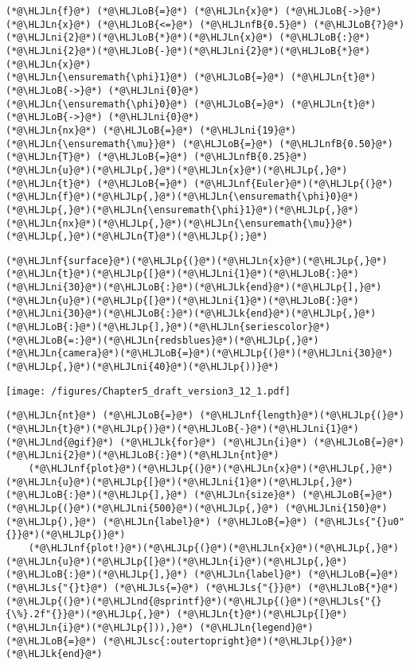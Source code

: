 \documentclass[12pt,landscape]{article}
\newcommand{\HLJLk}[1]{\textcolor[RGB]{148,91,176}{\textbf{#1}}}
\newcommand{\HLJLn}[1]{#1}
\newcommand{\HLJLnd}[1]{\textcolor[RGB]{214,102,97}{#1}}
\newcommand{\HLJLnf}[1]{\textcolor[RGB]{66,102,213}{#1}}
\newcommand{\HLJLs}[1]{\textcolor[RGB]{201,61,57}{#1}}
\newcommand{\HLJLsc}[1]{\textcolor[RGB]{201,61,57}{#1}}
\newcommand{\HLJLnfB}[1]{\textcolor[RGB]{59,151,46}{#1}}
\newcommand{\HLJLni}[1]{\textcolor[RGB]{59,151,46}{#1}}
\newcommand{\HLJLoB}[1]{\textcolor[RGB]{102,102,102}{\textbf{#1}}}
\newcommand{\HLJLp}[1]{#1}
\begin{document}
{\begin{lstlisting}
(*@\HLJLn{f}@*) (*@\HLJLoB{=}@*) (*@\HLJLn{x}@*) (*@\HLJLoB{->}@*) (*@\HLJLn{x}@*) (*@\HLJLoB{<=}@*) (*@\HLJLnfB{0.5}@*) (*@\HLJLoB{?}@*) (*@\HLJLni{2}@*)(*@\HLJLoB{*}@*)(*@\HLJLn{x}@*) (*@\HLJLoB{:}@*) (*@\HLJLni{2}@*)(*@\HLJLoB{-}@*)(*@\HLJLni{2}@*)(*@\HLJLoB{*}@*)(*@\HLJLn{x}@*)
(*@\HLJLn{\ensuremath{\phi}1}@*) (*@\HLJLoB{=}@*) (*@\HLJLn{t}@*) (*@\HLJLoB{->}@*) (*@\HLJLni{0}@*)
(*@\HLJLn{\ensuremath{\phi}0}@*) (*@\HLJLoB{=}@*) (*@\HLJLn{t}@*) (*@\HLJLoB{->}@*) (*@\HLJLni{0}@*)
(*@\HLJLn{nx}@*) (*@\HLJLoB{=}@*) (*@\HLJLni{19}@*)
(*@\HLJLn{\ensuremath{\mu}}@*) (*@\HLJLoB{=}@*) (*@\HLJLnfB{0.50}@*)
(*@\HLJLn{T}@*) (*@\HLJLoB{=}@*) (*@\HLJLnfB{0.25}@*)
(*@\HLJLn{u}@*)(*@\HLJLp{,}@*)(*@\HLJLn{x}@*)(*@\HLJLp{,}@*)(*@\HLJLn{t}@*) (*@\HLJLoB{=}@*) (*@\HLJLnf{Euler}@*)(*@\HLJLp{(}@*)(*@\HLJLn{f}@*)(*@\HLJLp{,}@*)(*@\HLJLn{\ensuremath{\phi}0}@*)(*@\HLJLp{,}@*)(*@\HLJLn{\ensuremath{\phi}1}@*)(*@\HLJLp{,}@*)(*@\HLJLn{nx}@*)(*@\HLJLp{,}@*)(*@\HLJLn{\ensuremath{\mu}}@*)(*@\HLJLp{,}@*)(*@\HLJLn{T}@*)(*@\HLJLp{);}@*)
\end{lstlisting}


\begin{lstlisting}
(*@\HLJLnf{surface}@*)(*@\HLJLp{(}@*)(*@\HLJLn{x}@*)(*@\HLJLp{,}@*)(*@\HLJLn{t}@*)(*@\HLJLp{[}@*)(*@\HLJLni{1}@*)(*@\HLJLoB{:}@*)(*@\HLJLni{30}@*)(*@\HLJLoB{:}@*)(*@\HLJLk{end}@*)(*@\HLJLp{],}@*)(*@\HLJLn{u}@*)(*@\HLJLp{[}@*)(*@\HLJLni{1}@*)(*@\HLJLoB{:}@*)(*@\HLJLni{30}@*)(*@\HLJLoB{:}@*)(*@\HLJLk{end}@*)(*@\HLJLp{,}@*)(*@\HLJLoB{:}@*)(*@\HLJLp{],}@*)(*@\HLJLn{seriescolor}@*)(*@\HLJLoB{=:}@*)(*@\HLJLn{redsblues}@*)(*@\HLJLp{,}@*) (*@\HLJLn{camera}@*)(*@\HLJLoB{=}@*)(*@\HLJLp{(}@*)(*@\HLJLni{30}@*)(*@\HLJLp{,}@*)(*@\HLJLni{40}@*)(*@\HLJLp{))}@*)
\end{lstlisting}

\texttt{[image: /figures/Chapter5\_draft\_version3\_12\_1.pdf]}

\begin{lstlisting}
(*@\HLJLn{nt}@*) (*@\HLJLoB{=}@*) (*@\HLJLnf{length}@*)(*@\HLJLp{(}@*)(*@\HLJLn{t}@*)(*@\HLJLp{)}@*)(*@\HLJLoB{-}@*)(*@\HLJLni{1}@*)
(*@\HLJLnd{@gif}@*) (*@\HLJLk{for}@*) (*@\HLJLn{i}@*) (*@\HLJLoB{=}@*) (*@\HLJLni{2}@*)(*@\HLJLoB{:}@*)(*@\HLJLn{nt}@*) 
    (*@\HLJLnf{plot}@*)(*@\HLJLp{(}@*)(*@\HLJLn{x}@*)(*@\HLJLp{,}@*) (*@\HLJLn{u}@*)(*@\HLJLp{[}@*)(*@\HLJLni{1}@*)(*@\HLJLp{,}@*)(*@\HLJLoB{:}@*)(*@\HLJLp{],}@*) (*@\HLJLn{size}@*) (*@\HLJLoB{=}@*) (*@\HLJLp{(}@*)(*@\HLJLni{500}@*)(*@\HLJLp{,}@*) (*@\HLJLni{150}@*)(*@\HLJLp{),}@*) (*@\HLJLn{label}@*) (*@\HLJLoB{=}@*) (*@\HLJLs{"{}u0"{}}@*)(*@\HLJLp{)}@*)
    (*@\HLJLnf{plot!}@*)(*@\HLJLp{(}@*)(*@\HLJLn{x}@*)(*@\HLJLp{,}@*) (*@\HLJLn{u}@*)(*@\HLJLp{[}@*)(*@\HLJLn{i}@*)(*@\HLJLp{,}@*)(*@\HLJLoB{:}@*)(*@\HLJLp{],}@*) (*@\HLJLn{label}@*) (*@\HLJLoB{=}@*) (*@\HLJLs{"{}t}@*) (*@\HLJLs{=}@*) (*@\HLJLs{"{}}@*) (*@\HLJLoB{*}@*) (*@\HLJLp{(}@*)(*@\HLJLnd{@sprintf}@*)(*@\HLJLp{(}@*)(*@\HLJLs{"{}{\%}.2f"{}}@*)(*@\HLJLp{,}@*) (*@\HLJLn{t}@*)(*@\HLJLp{[}@*)(*@\HLJLn{i}@*)(*@\HLJLp{])),}@*) (*@\HLJLn{legend}@*) (*@\HLJLoB{=}@*) (*@\HLJLsc{:outertopright}@*)(*@\HLJLp{)}@*)
(*@\HLJLk{end}@*)
\end{lstlisting}

}
\end{document}
